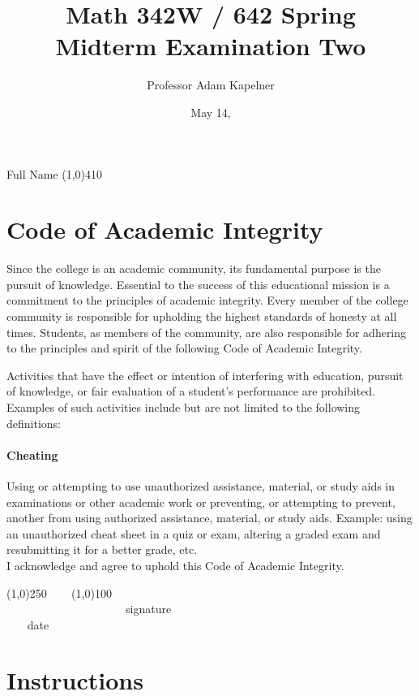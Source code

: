 \documentclass[12pt]{article}
\title{Math 342W / 642 Spring \the\year \\ Midterm Examination Two}
\author{Professor Adam Kapelner}
\date{May 14, \the\year}
\begin{document}
\maketitle

\noindent Full Name \line(1,0){410}

\thispagestyle{empty}

\section*{Code of Academic Integrity}

\footnotesize
Since the college is an academic community, its fundamental purpose is the pursuit of knowledge. Essential to the success of this educational mission is a commitment to the principles of academic integrity. Every member of the college community is responsible for upholding the highest standards of honesty at all times. Students, as members of the community, are also responsible for adhering to the principles and spirit of the following Code of Academic Integrity.

Activities that have the effect or intention of interfering with education, pursuit of knowledge, or fair evaluation of a student's performance are prohibited. Examples of such activities include but are not limited to the following definitions:

\paragraph{Cheating} Using or attempting to use unauthorized assistance, material, or study aids in examinations or other academic work or preventing, or attempting to prevent, another from using authorized assistance, material, or study aids. Example: using an unauthorized cheat sheet in a quiz or exam, altering a graded exam and resubmitting it for a better grade, etc.
\\

\noindent I acknowledge and agree to uphold this Code of Academic Integrity. \\

\begin{center}
\line(1,0){250} ~~~ \line(1,0){100}\\
~~~~~~~~~~~~~~~~~~~~~signature~~~~~~~~~~~~~~~~~~~~~~~~~~~~~~~~~~~~~~~~~~~~~ date
\end{center}

\normalsize
\vspace{-0.5cm}
\section*{Instructions}
\end{document}
